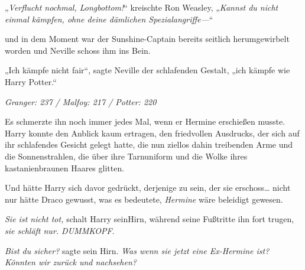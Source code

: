 „\emph{Verflucht nochmal, Longbottom!}“ kreischte Ron Weasley, „\emph{Kannst du nicht einmal kämpfen, ohne deine dämlichen Spezialangriffe—}“

und in dem Moment war der Sunshine-Captain bereits seitlich herumgewirbelt worden und Neville schoss ihm ins Bein.

„Ich kämpfe nicht fair“, sagte Neville der schlafenden Gestalt, „ich kämpfe wie Harry Potter.“

\later

\emph{Granger: 237 / Malfoy: 217 / Potter: 220}

Es schmerzte ihn noch immer jedes Mal, wenn er Hermine erschießen musste. Harry konnte den Anblick kaum ertragen, den friedvollen Ausdrucks, der sich auf ihr schlafendes Gesicht gelegt hatte, die nun ziellos dahin treibenden Arme und die Sonnenstrahlen, die über ihre Tarnuniform und die Wolke ihres kastanienbraunen Haares glitten.

Und hätte Harry sich davor gedrückt, derjenige zu sein, der sie erschoss… nicht nur hätte Draco gewusst, was es bedeutete, \emph{Hermine} wäre beleidigt gewesen.

\emph{Sie ist nicht tot,} schalt Harry seinHirn, während seine Fußtritte ihn fort trugen, \emph{sie schläft nur. DUMMKOPF.}

\emph{Bist du sicher?} sagte sein Hirn. \emph{Was wenn sie jetzt eine Ex-Hermine ist? Könnten wir zurück und nachsehen?}%

